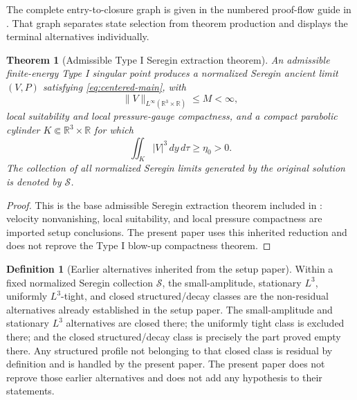 \documentclass[11pt]{amsart}
\numberwithin{equation}{section}
\theoremstyle{plain}
\newtheorem{theorem}{Theorem}[section]
\theoremstyle{definition}
\newtheorem{definition}[definition]{Definition}
\theoremstyle{remark}
\newcommand{\R}{\mathbb R}
\newcommand{\calS}{\mathcal S}
\begin{document}
The complete entry-to-closure graph is given in the numbered proof-flow guide
in .  That graph separates state selection from
theorem production and displays the terminal alternatives individually.

\begin{theorem}[Admissible Type I Seregin extraction theorem]
\label{hyp:base-seregin-hypotheses}
An admissible finite-energy Type I singular point produces a normalized Seregin
ancient limit \((V,P)\) satisfying \eqref{eq:centered-main}, with
\[
   \|V\|_{L^\infty(\R^3\times\R)}\le M<\infty,
\]
local suitability and local pressure-gauge compactness, and a compact
parabolic cylinder \(K\Subset\R^3\times\R\) for which
\begin{equation}\label{eq:positive-velocity-main}
   \iint_K |V|^3\,dy\,d\tau
   \ge \eta_0>0 .
\end{equation}
The collection of all normalized Seregin limits generated by the original
solution is
denoted by \(\calS\).
\end{theorem}

\begin{proof}
This is the base admissible Seregin extraction theorem included in
: velocity nonvanishing, local suitability,
and local pressure compactness are imported setup conclusions.  The present
paper uses this inherited reduction and does not reprove the Type I blow-up
compactness theorem.
\end{proof}

\begin{definition}[Earlier alternatives inherited from the setup paper]
\label{hyp:previous-nonresidual}
Within a fixed normalized Seregin collection \(\calS\), the small-amplitude,
stationary \(L^3\), uniformly \(L^3\)-tight, and closed structured/decay
classes are the non-residual alternatives already established in the setup
paper.  The small-amplitude and stationary \(L^3\) alternatives are closed
there; the uniformly tight class is excluded there; and the closed structured/decay
class is precisely the part proved empty there.  Any structured profile not
belonging to that closed class is residual by definition and is handled by
the present paper.  The present paper does not reprove those earlier
alternatives and does not add any hypothesis to their statements.
\end{definition}
\end{document}

